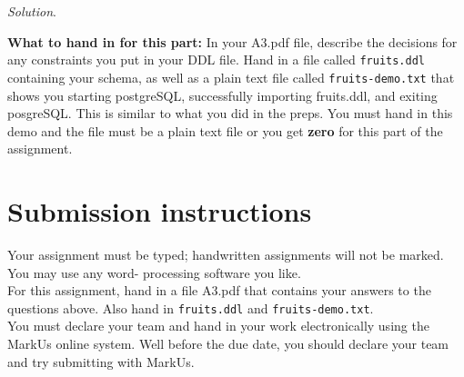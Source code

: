 \documentclass[10pt]{article}
\begin{document}
\begin{enumerate}
\begin{enumerate}
        \begin{mdframed}[leftmargin=-6.5mm]
        \textit{Solution}.\\
        \end{mdframed}
        
    \end{enumerate}
    
    \textbf{What to hand in for this part:}
    In your A3.pdf file, describe the decisions for any constraints you put in your DDL file. Hand in a file called \texttt{fruits.ddl} containing your schema, as well as a plain text file called \texttt{fruits-demo.txt} that shows you starting postgreSQL, successfully importing fruits.ddl, and exiting posgreSQL. This is similar to what you did in the preps. You must hand in this demo and the file must be a plain text file or you get \textbf{zero} for this part of the assignment.
\end{enumerate}

\section*{Submission instructions}
Your assignment must be typed; handwritten assignments will not be marked. You may use any word- processing software you like.\\
For this assignment, hand in a file A3.pdf that contains your answers to the questions above. Also hand in \texttt{fruits.ddl} and \texttt{fruits-demo.txt}.\\
You must declare your team and hand in your work electronically using the MarkUs online system. Well before the due date, you should declare your team and try submitting with MarkUs.
\end{document}
